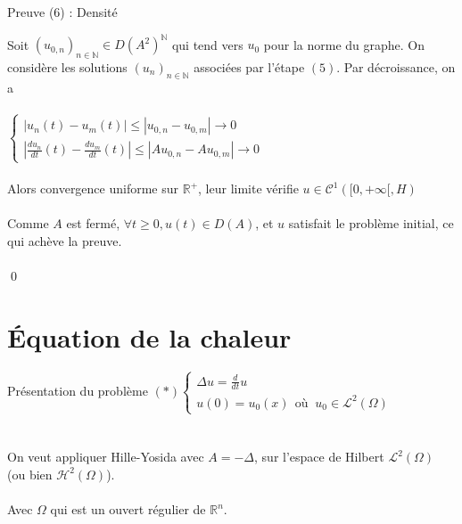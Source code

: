 \documentclass[10pt]{beamer}
\begin{document}
\begin{frame}{Preuve (6) : Densité}

Soit $(u_{0,n})_{n\in \mathbb{N}} \in D(A^2)^\mathbb{N}$ qui tend vers $u_0$ pour la norme du graphe. On considère les solutions $(u_{n})_{n\in \mathbb{N}}$ associées par l'étape $(5)$. Par décroissance, on a \\~\\
$\begin{cases} |u_{n}(t) - u_{m}(t)| \leq |u_{0,n}-u_{0,m}| \to 0 \\ \displaystyle |\frac{du_{n}}{dt}(t) - \frac{du_{m}}{dt}(t)|\leq |Au_{0,n}-Au_{0,m}| \to 0 \end{cases}$ \\ ~ \\ 

Alors convergence uniforme sur $\mathbb{R}^+$, leur limite vérifie $u\in \mathcal{C}^1([0,+\infty[,H)$ \\~\\
Comme $A$ est fermé, $\forall t \geq 0, u(t) \in D(A)$, et $u$ satisfait le problème initial, ce qui achève la preuve. \\~\\ \qed
\end{frame}
\section{Équation de la chaleur}

\begin{frame}{Présentation du problème}
$(*)\begin{cases}  \Delta u = \frac{d}{dt}u \\ u(0)=u_0(x) \ \ \text{où } \ u_0 \in \mathcal{L}^2(\Omega) \end{cases}$ \\ ~ \\ ~ \\ 

On veut appliquer Hille-Yosida avec $A=-\Delta$, sur l'espace de Hilbert $\mathcal{L}^2(\Omega)$ (ou bien $\mathcal{H}^2(\Omega)$). \\ ~ \\ 

Avec $\Omega$ qui est un ouvert régulier de $\mathbb{R}^n$.
\end{frame}
\end{document}
